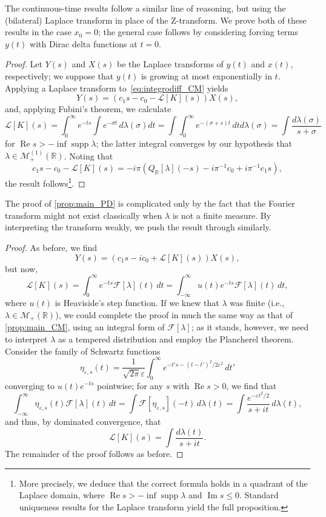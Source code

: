 \documentclass{cams-l} %
\newcommand{\RR}{\mathbb R}
\newcommand{\cL}{\mathcal L}
\newcommand{\cM}{\mathcal M}
\newcommand{\cF}{\mathcal F}
\newcommand{\eps}{\varepsilon}
\newcommand{\op}{\operatorname}
\newcommand{\supp}{\operatorname{supp}}
\renewcommand{\Re}{\op{Re}}
\renewcommand{\Im}{\op{Im}}
\theoremstyle{definition}
\theoremstyle{remark}
\numberwithin{equation}{section}
\begin{document}
The continuous-time results follow a similar line of reasoning, but using the (bilateral) Laplace transform in place of the Z-transform. We prove both of these results in the case $x_0=0$; the general case follows by considering forcing terms $y(t)$ with Dirac delta functions at $t=0$.
\propmainCM*
\begin{proof}
    Let $Y(s)$ and $X(s)$ be the Laplace transforms of $y(t)$ and $x(t)$, respectively; we suppose that $y(t)$ is growing at most exponentially in $t$. Applying a Laplace transform to~\ref{eq:integrodiff_CM} yields
    \[Y(s) = \left(c_1s - c_0 - \cL[K](s)\right)X(s),\]
    and, applying Fubini's theorem, we calculate
    \[\cL[K](s) = \int_0^\infty e^{-t s}\int e^{-\sigma t}\,d\lambda(\sigma)dt = \int \int_0^\infty e^{-(\sigma+s) t}\,dt  d\lambda(\sigma) = \int\frac{d\lambda(\sigma)}{s + \sigma}\]
    for $\Re s> -\inf\supp\lambda$; the latter integral converges by our hypothesis that $\lambda\in\cM_+^{(1)}(\RR)$. Noting that
    \[c_1s - c_0 - \cL[K](s) = -i\pi\left(Q_\RR[\lambda](-s) - i\pi^{-1}c_0 + i\pi^{-1}c_1s\right),\]
    the result follows\footnote{More precisely, we deduce that the correct formula holds in a quadrant of the Laplace domain, where $\Re s>-\inf\supp\lambda$ and $\Im s\leq 0$. Standard uniqueness results for the Laplace transform yield the full proposition.}.
\end{proof}

The proof of \cref{prop:main_PD} is complicated only by the fact that the Fourier transform might not exist classically when $\lambda$ is not a finite measure. By interpreting the transform weakly, we push the result through similarly.
\propmainPD*
\begin{proof}
    As before, we find
    \[Y(s) = \left(c_1s -ic_0 + \cL[K](s)\right)X(s),\]
    but now,
    \[\cL[K](s) = \int_0^\infty e^{-t s}\cF[\lambda](t)\,dt = \int_{-\infty}^{\infty}u(t)e^{-ts}\cF[\lambda](t)\,dt,\]
    where $u(t)$ is Heaviside's step function. If we knew that $\lambda$ was finite (i.e., $\lambda\in\cM_+(\RR)$), we could complete the proof in much the same way as that of \cref{prop:main_CM}, using an integral form of $\cF[\lambda]$; as it stands, however, we need to interpret $\lambda$ as a tempered distribution and employ the Plancherel theorem. Consider the family of Schwartz functions 
    \[\eta_{\eps,s}(t) = \frac{1}{\sqrt{2\pi}\eps}\int_{0}^\infty e^{-t's -(t-t')^2/2\eps^2}\,dt'\]
    converging to $u(t)e^{-ts}$ pointwise; for any $s$ with $\Re s > 0$, we find that
    \[\int_{-\infty}^{\infty}\eta_{\eps,s}(t)\cF[\lambda](t)\,dt = \int \cF[\eta_{\eps,s}](-t)\,d\lambda(t) = \int \frac{e^{-\eps t^2/2}}{s+it}\,d\lambda(t),\]
    and thus, by dominated convergence, that
    \[\cL[K](s) = \int \frac{d\lambda(t)}{s+it}.\]
    The remainder of the proof follows as before.
\end{proof}
\end{document}
